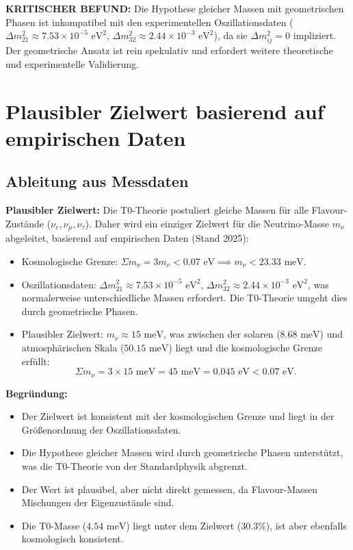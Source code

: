 \documentclass[12pt,a4paper]{article}
\begin{document}
	\begin{warning}
		\textbf{KRITISCHER BEFUND:} Die Hypothese gleicher Massen mit geometrischen Phasen ist inkompatibel mit den experimentellen Oszillationsdaten (\(\Delta m^2_{21} \approx 7.53 \times 10^{-5} \text{ eV}^2\), \(\Delta m^2_{32} \approx 2.44 \times 10^{-3} \text{ eV}^2\)), da sie \(\Delta m^2_{ij} = 0\) impliziert. Der geometrische Ansatz ist rein spekulativ und erfordert weitere theoretische und experimentelle Validierung.
	\end{warning}
	
	\section{Plausibler Zielwert basierend auf empirischen Daten}
	
	\subsection{Ableitung aus Messdaten}
	
	\begin{experimental}
		\textbf{Plausibler Zielwert:}
		Die T0-Theorie postuliert gleiche Massen für alle Flavour-Zustände (\(\nu_e, \nu_\mu, \nu_\tau\)). Daher wird ein einziger Zielwert für die Neutrino-Masse \(m_\nu\) abgeleitet, basierend auf empirischen Daten (Stand 2025):
		\begin{itemize}
			\item Kosmologische Grenze: \(\Sigma m_\nu = 3 m_\nu < 0.07 \text{ eV} \implies m_\nu < 23.33 \text{ meV}\).
			\item Oszillationsdaten: \(\Delta m^2_{21} \approx 7.53 \times 10^{-5} \text{ eV}^2\), \(\Delta m^2_{32} \approx 2.44 \times 10^{-3} \text{ eV}^2\), was normalerweise unterschiedliche Massen erfordert. Die T0-Theorie umgeht dies durch geometrische Phasen.
			\item Plausibler Zielwert: \(m_\nu \approx 15 \text{ meV}\), was zwischen der solaren (\(8.68 \text{ meV}\)) und atmosphärischen Skala (\(50.15 \text{ meV}\)) liegt und die kosmologische Grenze erfüllt:
			\[
			\Sigma m_\nu = 3 \times 15 \text{ meV} = 45 \text{ meV} = 0.045 \text{ eV} < 0.07 \text{ eV}.
			\]
		\end{itemize}
		
		\textbf{Begründung:}
		\begin{itemize}
			\item Der Zielwert ist konsistent mit der kosmologischen Grenze und liegt in der Größenordnung der Oszillationsdaten.
			\item Die Hypothese gleicher Massen wird durch geometrische Phasen unterstützt, was die T0-Theorie von der Standardphysik abgrenzt.
			\item Der Wert ist plausibel, aber nicht direkt gemessen, da Flavour-Massen Mischungen der Eigenzustände sind.
			\item Die T0-Masse (\(4.54 \text{ meV}\)) liegt unter dem Zielwert (\(30.3\%\)), ist aber ebenfalls kosmologisch konsistent.
		\end{itemize}
	\end{experimental}
	
\end{document}
